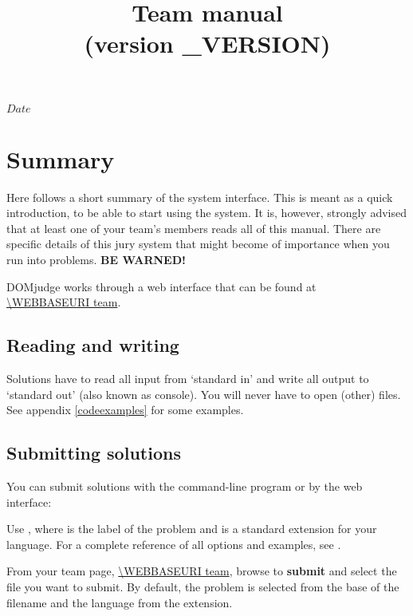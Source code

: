 

\usepackage[english]{babel}

\SVNdate $Date$

\title{Team manual \DOMjudge\\(version \DOMJUDGE_VERSION)}



\begin{titlepage}
\maketitle
\end{titlepage}

\newpage

\section*{Summary}

Here follows a short summary of the system interface. This is meant as
a quick introduction, to be able to start using the system. It is,
however, strongly advised that at least one of your team's members
reads all of this manual. There are specific details of this
jury system that might become of importance when you run into
problems. \textbf{BE WARNED!}

DOMjudge works through a web interface that can be found at\\
\url{\WEBBASEURI team}.

\subsection*{Reading and writing}

Solutions have to read all input from `standard in' and write all
output to `standard out' (also known as console). You will never have
to open (other) files. See appendix \ref{codeexamples} for some
examples.

\subsection*{Submitting solutions}

You can submit solutions with the command-line program  or
by the web interface:
\begin{description}[\breaklabel\setlabelstyle{\bfseries}]
\item[Command-line]
Use , where  is the
label of the problem and  is a standard extension for
your language.  For a complete reference of all options and examples,
see .
\item[Web interface]
From your team page, \url{\WEBBASEURI team}, browse to
\textbf{submit} and select the file you want to submit. By default,
the problem is selected from the base of the filename and the language
from the extension.
\end{description}

